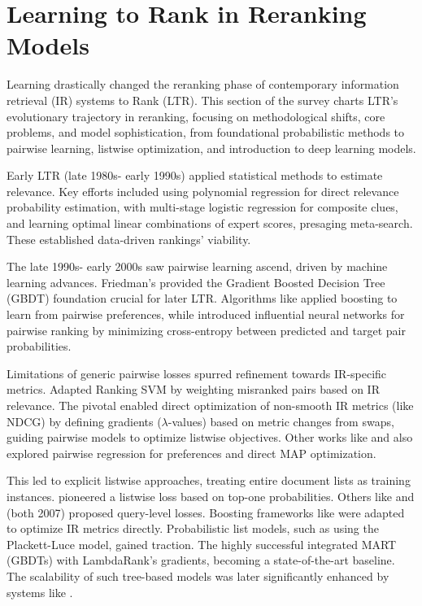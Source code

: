 \documentclass[runningheads]{llncs}
\begin{document}
\section{Learning to Rank in Reranking Models} \label{ltr-rerankers}
Learning drastically changed the reranking phase of contemporary information retrieval (IR) systems to Rank (LTR). This section of the survey charts LTR's evolutionary trajectory in reranking, focusing on methodological shifts, core problems, and model sophistication, from foundational probabilistic methods to pairwise learning, listwise optimization, and introduction to deep learning models.

Early LTR (late 1980s- early 1990s) applied statistical methods to estimate relevance. Key efforts included \cite{10.1145/65943.65944} using polynomial regression for direct relevance probability estimation, \cite{10.1145/133160.133199} with multi-stage logistic regression for composite clues, and \cite{10.5555/188490.188554} learning optimal linear combinations of expert scores, presaging meta-search. These established data-driven rankings' viability.

The late 1990s- early 2000s saw pairwise learning ascend, driven by machine learning advances. Friedman's \cite{4a848dd1-54e3-3c3c-83c3-04977ded2e71} provided the Gradient Boosted Decision Tree (GBDT) foundation crucial for later LTR. Algorithms like \cite{10.5555/945365.964285} applied boosting to learn from pairwise preferences, while \cite{10.1145/1102351.1102363} introduced influential neural networks for pairwise ranking by minimizing cross-entropy between predicted and target pair probabilities.

Limitations of generic pairwise losses spurred refinement towards IR-specific metrics. \cite{10.1145/1148170.1148205} Adapted Ranking SVM by weighting misranked pairs based on IR relevance. The pivotal \cite{paper8_ltr} enabled direct optimization of non-smooth IR metrics (like NDCG) by defining gradients ($\lambda$-values) based on metric changes from swaps, guiding pairwise models to optimize listwise objectives. Other works like \cite{paper9_ltr} and \cite{10.1145/1277741.1277790} also explored pairwise regression for preferences and direct MAP optimization.

This led to explicit listwise approaches, treating entire document lists as training instances. \cite{cao2007learning} pioneered a listwise loss based on top-one probabilities. Others like \cite{QIN2008838} and \cite{tsai2006frank} (both 2007) proposed query-level losses. Boosting frameworks like \cite{10.1145/1277741.1277809} were adapted to optimize IR metrics directly. Probabilistic list models, such as \cite{10.1145/1390156.1390306} using the Plackett-Luce model, gained traction. The highly successful \cite{burges2008ranking} integrated MART (GBDTs) with LambdaRank's gradients, becoming a state-of-the-art baseline. The scalability of such tree-based models was later significantly enhanced by systems like \cite{Chen_2016}.
\end{document}
